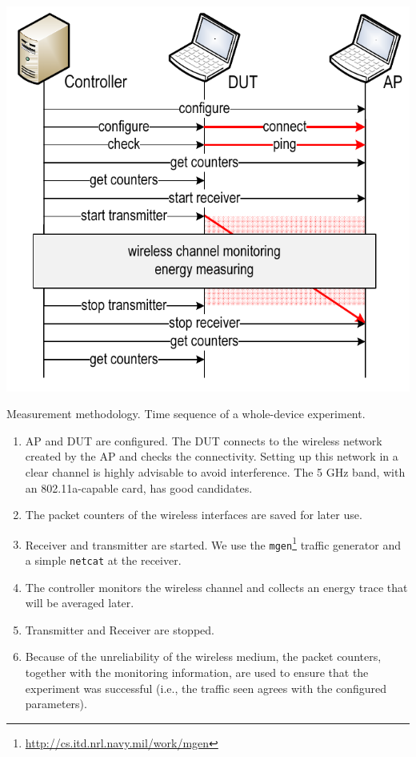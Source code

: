 \documentclass[twoside,nohyper]{tufte-book}
\providecommand{\tightlist}{%
  \setlength{\itemsep}{0pt}\setlength{\parskip}{0pt}}
\begin{document}
\begin{marginfigure}

{\centering \includegraphics[width=1\linewidth]{img/03/sequence} 

}

\caption[Measurement methodology. Time sequence of a whole-device experiment.]{Measurement methodology. Time sequence of a whole-device experiment.}\label{fig:sequence}
\end{marginfigure}

\begin{enumerate}
\def\labelenumi{\arabic{enumi}.}
\tightlist
\item
  AP and DUT are configured. The DUT connects to the wireless network created by the AP and checks the connectivity. Setting up this network in a clear channel is highly advisable to avoid interference. The 5 GHz band, with an 802.11a-capable card, has good candidates.
\item
  The packet counters of the wireless interfaces are saved for later use.
\item
  Receiver and transmitter are started. We use the \texttt{mgen}\footnote{\url{http://cs.itd.nrl.navy.mil/work/mgen}} traffic generator and a simple \texttt{netcat} at the receiver.
\item
  The controller monitors the wireless channel and collects an energy trace that will be averaged later.
\item
  Transmitter and Receiver are stopped.
\item
  Because of the unreliability of the wireless medium, the packet counters, together with the monitoring information, are used to ensure that the experiment was successful (i.e., the traffic seen agrees with the configured parameters).
\end{enumerate}
\end{document}
